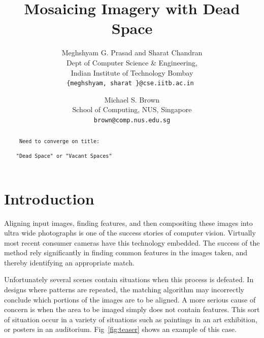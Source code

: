 \documentclass[10pt,twocolumn,letterpaper]{article}
\begin{document}
\title{Mosaicing Imagery with Dead Space}

\author{Meghshyam G. Prasad and Sharat Chandran\\
Dept of Computer Science \& Engineering, \\
Indian Institute of Technology Bombay\\
{\tt\small \{meghshyam, sharat \}@cse.iitb.ac.in }
\and
Michael S. Brown\\
School of Computing, NUS, Singapore\\
{\tt\small brown@comp.nus.edu.sg}
}

\maketitle


\begin{abstract}

{\color{red} 
\noindent \verb+ Need to converge on title: +

\noindent \verb+"Dead Space" or "Vacant Spaces"+ 

}

   
\end{abstract}

\section{Introduction}

Aligning input images, finding features, and then compositing these
images into ultra wide photographs is one of the success stories of
computer vision.  Virtually most recent consumer cameras have this
technology embedded.  The success of the method rely significantly in
finding common features in the images taken, and thereby identifying an
appropriate match.

Unfortunately several scenes contain situations when this process is
defeated.  In designs where patterns are repeated, the matching
algorithm may incorrectly conclude which portions of the images are to
be aligned. 
A more serious cause of concern is when the area to be imaged simply
does not contain features.  This sort of situation occur in a variety
of situations such as paintings in an art exhibition, or posters in an
auditorium.  Fig~\ref{fig:teaser} shows an example of this
case. 
\end{document}

